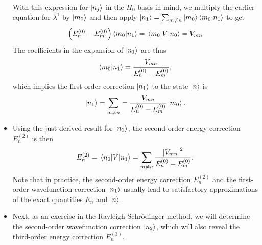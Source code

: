 \documentclass[11pt, a4paper]{article}
\newcommand{\Schro}{Schr\"{o}dinger\xspace}
\begin{document}
\begin{itemize}
    With this expression for $ \ket{n_{j}} $ in the $ H_{0} $ basis in mind, we multiply the earlier equation for $ \lambda^{1} $ by $ \ket{m_{0}} $ and then apply $ \ket{n_{1}} = \sum_{m \neq n}\ket{m_{0}}\braket{m_{0}}{n_{1}} $ to get
    \begin{equation*}
        \left( E_{n}^{(0)} - E_{m}^{(0)} \right)\braket{m_{0}}{n_{1}} = \mel{m_{0}}{V}{n_{0}} = V_{mn}
    \end{equation*}
    The coefficients in the expansion of $ \ket{n_{1}} $ are thus
    \begin{equation*}
        \braket{m_{0}}{n_{1}} = \frac{V_{mn}}{E_{n}^{(0)} - E_{m}^{(0)}},
    \end{equation*}
    which implies the first-order correction $ \ket{n_{1}} $ to the state $ \ket{n} $ is
    \begin{equation*}
        \ket{n_{1}} = \sum_{m\neq n} = \frac{V_{mn}}{E_{n}^{(0)} - E_{m}^{(0)}} \ket{m_{0}}.
    \end{equation*}

    \item Using the just-derived result for $ \ket{n_{1}} $, the second-order energy correction $ E_{n}^{(2)} $ is then
    \begin{equation*}
        E_{n}^{(2)} = \mel{n_{0}}{V}{n_{1}} = \sum_{m \neq n} \frac{\abs{V_{mn}}^{2}}{E_{n}^{(0)} - E_{m}^{(0)}}.
    \end{equation*}
    Note that in practice, the second-order energy correction $ E_{n}^{(2)} $ and the first-order wavefunction correction $ \ket{n_{1}} $ usually lead to satisfactory approximations of the exact quantities $ E_{n} $ and $ \ket{n} $.

    \item Next, as an exercise in the Rayleigh-\Schro method, we will determine the second-order wavefunction correction $ \ket{n_{2}} $, which will also reveal the third-order energy correction $ E_{n}^{(3)} $. 


\end{itemize}
\end{document}
